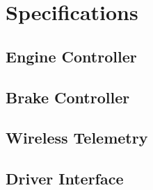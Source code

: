 %
%
%
%

\section{Specifications}

\subsection{Engine Controller}
\subsection{Brake Controller}
\subsection{Wireless Telemetry}
\subsection{Driver Interface}
